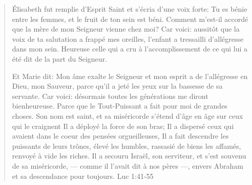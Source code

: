 

\begin{quote}
Élisabeth fut remplie d’Esprit Saint et s’écria d’une voix forte: Tu es bénie entre les femmes, et le fruit de ton sein est béni. Comment m’est-il accordé que la mère de mon Seigneur vienne chez moi? Car voici: aussitôt que la voix de ta salutation a frappé mes oreilles, l’enfant a tressailli d’allégresse dans mon sein. Heureuse celle qui a cru à l’accomplissement de ce qui lui a été dit de la part du Seigneur.

Et Marie dit: Mon âme exalte le Seigneur et mon esprit a de l’allégresse en Dieu, mon Sauveur, parce qu’il a jeté les yeux sur la bassesse de sa servante. Car voici: désormais toutes les générations me diront bienheureuse. Parce que le Tout-Puissant a fait pour moi de grandes choses. Son nom est saint, et sa miséricorde s’étend d’âge en âge sur ceux qui le craignent Il a déployé la force de son bras; Il a dispersé ceux qui avaient dans le coeur des pensées orgueilleuses, Il a fait descendre les puissants de leurs trônes, élevé les humbles, rassasié de biens les affamés, renvoyé à vide les riches. Il a secouru Israël, son serviteur, et s’est souvenu de sa miséricorde, — comme il l’avait dit à nos pères —, envers Abraham et sa descendance pour toujours.
Luc 1:41-55
\end{quote}

